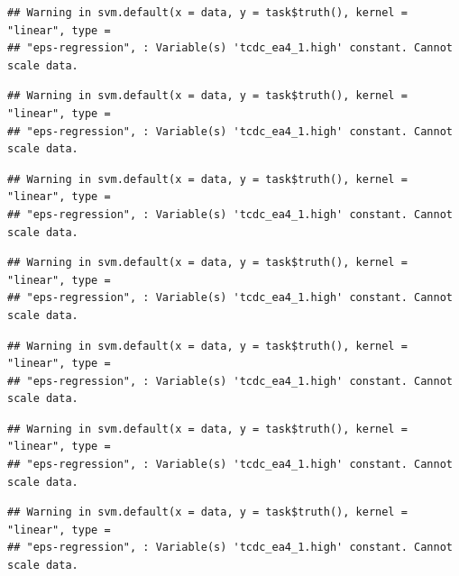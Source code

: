 \documentclass[
  11pt,
  a4paper,
]{article}
\newenvironment{Shaded}{\begin{snugshade}}{\end{snugshade}}
\newcommand{\CommentTok}[1]{\textcolor[rgb]{0.56,0.35,0.01}{\textit{#1}}}
\newcommand{\DecValTok}[1]{\textcolor[rgb]{0.00,0.00,0.81}{#1}}
\newcommand{\FunctionTok}[1]{\textcolor[rgb]{0.00,0.00,0.00}{#1}}
\newcommand{\NormalTok}[1]{#1}
\newcommand{\OtherTok}[1]{\textcolor[rgb]{0.56,0.35,0.01}{#1}}
\newcommand{\SpecialCharTok}[1]{\textcolor[rgb]{0.00,0.00,0.00}{#1}}
\begin{document}
\begin{verbatim}
## Warning in svm.default(x = data, y = task$truth(), kernel = "linear", type =
## "eps-regression", : Variable(s) 'tcdc_ea4_1.high' constant. Cannot scale data.
\end{verbatim}

\begin{verbatim}
## Warning in svm.default(x = data, y = task$truth(), kernel = "linear", type =
## "eps-regression", : Variable(s) 'tcdc_ea4_1.high' constant. Cannot scale data.
\end{verbatim}

\begin{verbatim}
## Warning in svm.default(x = data, y = task$truth(), kernel = "linear", type =
## "eps-regression", : Variable(s) 'tcdc_ea4_1.high' constant. Cannot scale data.
\end{verbatim}

\begin{verbatim}
## Warning in svm.default(x = data, y = task$truth(), kernel = "linear", type =
## "eps-regression", : Variable(s) 'tcdc_ea4_1.high' constant. Cannot scale data.
\end{verbatim}

\begin{verbatim}
## Warning in svm.default(x = data, y = task$truth(), kernel = "linear", type =
## "eps-regression", : Variable(s) 'tcdc_ea4_1.high' constant. Cannot scale data.
\end{verbatim}

\begin{verbatim}
## Warning in svm.default(x = data, y = task$truth(), kernel = "linear", type =
## "eps-regression", : Variable(s) 'tcdc_ea4_1.high' constant. Cannot scale data.
\end{verbatim}

\begin{verbatim}
## Warning in svm.default(x = data, y = task$truth(), kernel = "linear", type =
## "eps-regression", : Variable(s) 'tcdc_ea4_1.high' constant. Cannot scale data.
\end{verbatim}

\begin{Shaded}
\end{Shaded}
\end{document}
